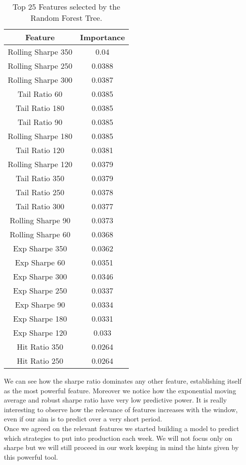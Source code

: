 \begin{table}
	\centering
	\begin{tabular}{c|c}
		Feature & Importance \\\hline \hline
		Rolling Sharpe 350 & 0.04 \\ 
		Rolling Sharpe 250 & 0.0388 \\ 
		Rolling Sharpe 300 & 0.0387 \\ 
		Tail Ratio 60 & 0.0385 \\ 
		Tail Ratio 180 & 0.0385 \\ 
		Tail Ratio 90 & 0.0385 \\ 
		Rolling Sharpe 180 & 0.0385 \\ 
		Tail Ratio 120 & 0.0381 \\ 
		Rolling Sharpe 120 & 0.0379 \\ 
		Tail Ratio 350 & 0.0379 \\ 
		Tail Ratio 250 & 0.0378 \\ 
		Tail Ratio 300 & 0.0377 \\ 
		Rolling Sharpe 90 & 0.0373 \\ 
		Rolling Sharpe 60 & 0.0368 \\ 
		Exp Sharpe 350 & 0.0362 \\ 
		Exp Sharpe 60 & 0.0351 \\ 
		Exp Sharpe 300 & 0.0346 \\ 
		Exp Sharpe 250 & 0.0337 \\ 
		Exp Sharpe 90 & 0.0334 \\ 
		Exp Sharpe 180 & 0.0331 \\ 
		Exp Sharpe 120 & 0.033 \\ 
		Hit Ratio 350 & 0.0264 \\ 
		Hit Ratio 250 & 0.0264 \\ 
	\end{tabular}
	\caption{ Top 25 Features selected by the Random Forest Tree.}
	\label{table:feature}
\end{table}


We can see how the sharpe ratio dominates any other feature, establishing itself as the most powerful feature. Moreover we notice how the exponential moving average and robust sharpe ratio have very low predictive power. It is really interesting to observe how the relevance of features increases with the window, even if our aim is to predict over a very short period.\\
Once we agreed on the relevant features we started building a model to predict which strategies to put into production each week. We will not focus only on sharpe but we will still proceed in our work keeping in mind the hints given by this powerful tool.\\
